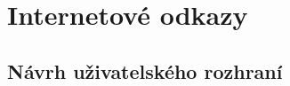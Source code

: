 \documentclass[twoside]{ctuthesis}
\begin{document}
%
%

\printbibliography[title={Seznam použité literatury}]

\appendix

%



\section{Internetové odkazy}
\subsection{Návrh uživatelského rozhraní}
\end{document}

